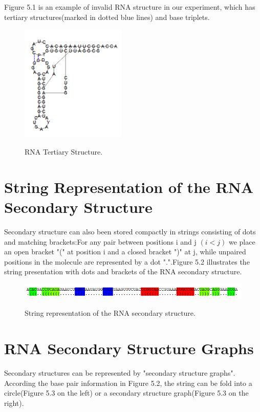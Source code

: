 Figure 5.1 is an example of invalid RNA structure in our experiment, which has tertiary structures(marked in dotted blue lines) and base triplets.
\begin{figure}
		\centering
		\includegraphics[width=5cm,clip]{Figures/RNATT}
		\label{RNA Tertiary Structure.} 
		\caption{RNA Tertiary Structure.}
\end{figure}
\section{String Representation of the RNA Secondary Structure}
Secondary structure can also been stored compactly in strings consisting of dots and matching brackets:For any pair between positions i and j $(i < j)$ we place an open bracket "(" at position i and a closed bracket ")" at j, while unpaired positions in the molecule are represented by a dot ".".Figure 5.2 illustrates the string presentation with dots and brackets of the RNA secondary structure. 

\begin{figure}
		\centering
		\includegraphics[width=18cm,clip]{Figures/RNAST1}
		\label{String Representation of the RNA Secondary Structure.} 
		\caption{String representation of the RNA secondary structure.}
\end{figure}
\section{RNA Secondary Structure Graphs}
Secondary structures can be represented by "secondary structure graphs". According the base pair information in Figure 5.2, the string can be fold into a circle(Figure 5.3 on the left) or a secondary structure graph(Figure 5.3 on the right).

